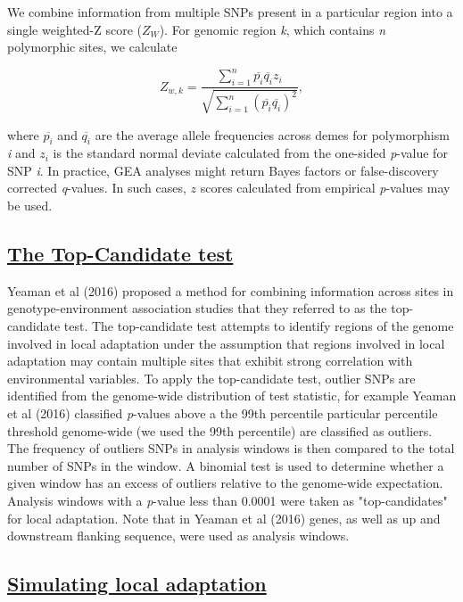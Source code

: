 \documentclass[11pt,twoside,lineno]{GSA_format}
\begin{document}
We combine information from multiple SNPs present in a particular region into a single weighted-Z score ($Z_W$). For genomic region \textit{k}, which contains \textit{n} polymorphic sites, we calculate 

\begin{equation}
\label{weightedZ}
Z_{w,k} =  \frac {\sum\limits_{i=1}^n \overline{p_i} \overline{q_i}z_i}{\sqrt{ \sum\limits_{i=1}^n (\overline{p_i}\overline{q_i})^2} },
\end{equation}

\noindent where $\overline{p_i}$ and $\overline{q_i}$ are the average allele frequencies across demes for polymorphism \textit{i} and $z_i$ is the standard normal deviate calculated from the one-sided \textit{p}-value for SNP \textit{i}. In practice, GEA analyses might return Bayes factors or false-discovery corrected \textit{q}-values. In such cases, $z$ scores calculated from empirical \textit{p}-values may be used.\\


\subsection{\underline{The Top-Candidate test}} 

Yeaman et al (2016) proposed a method for combining information across sites in genotype-environment association studies that they referred to as the top-candidate test. The top-candidate test attempts to identify regions of the genome involved in local adaptation under the assumption that regions involved in local adaptation may contain multiple sites that exhibit strong correlation with environmental variables. To apply the top-candidate test, outlier SNPs are identified from the genome-wide distribution of test statistic, for example Yeaman et al (2016) classified \textit{p}-values above a the 99th percentile particular percentile threshold genome-wide (we used the 99th percentile) are classified as outliers. The frequency of outliers SNPs in analysis windows is then compared to the total number of SNPs in the window. A binomial test is used to determine whether a given window has an excess of outliers relative to the genome-wide expectation. Analysis windows with a \textit{p}-value less than 0.0001 were taken as "top-candidates" for local adaptation. Note that in Yeaman et al (2016) genes, as well as up and downstream flanking sequence, were used as analysis windows. 


\subsection{\underline{Simulating local adaptation}} 
\end{document}
